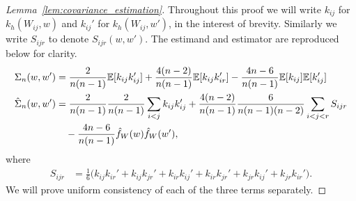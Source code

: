 \begin{proof}[Lemma~\ref{lem:covariance_estimation}]

  Throughout this proof we will write
  $k_{ij}$ for $k_h(W_{ij},w)$ and
  $k_{ij}'$ for $k_h(W_{ij},w')$,
  in the interest of brevity.
  Similarly we write $S_{ijr}$ to denote $S_{ijr}(w,w')$.
  The estimand and estimator are reproduced below for clarity.
  \begin{align*}
    \Sigma_n(w,w')
    &=
    \frac{2}{n(n-1)}
    \mathbb{E}[k_{ij} k_{ij}']
    + \frac{4(n-2)}{n(n-1)}
    \mathbb{E}[k_{ij} k_{ir}']
    - \frac{4n-6}{n(n-1)}
    \mathbb{E}[k_{ij}]
    \mathbb{E}[k_{ij}'] \\
    \hat \Sigma_n(w,w')
    &=
    \frac{2}{n(n-1)}
    \frac{2}{n(n-1)}
    \sum_{i<j}
    k_{ij}
    k_{ij}'
    +
    \frac{4(n-2)}{n(n-1)}
    \frac{6}{n(n-1)(n-2)}
    \sum_{i<j<r}
    S_{ijr} \\
    &\quad-
    \frac{4n-6}{n(n-1)}
    \hat f_W(w)
    \hat f_W(w'),
  \end{align*}
  where
  \begin{align*}
    S_{ijr}
    &=
    \frac{1}{6}
    \Big(
    k_{ij}
    k_{ir}'
    + k_{ij}
    k_{jr}'
    + k_{ir}
    k_{ij}'
    + k_{ir}
    k_{jr}'
    + k_{jr}
    k_{ij}'
    + k_{jr}
    k_{ir}'
    \Big).
  \end{align*}
  We will prove uniform consistency of each of the three terms separately.



\end{proof}
